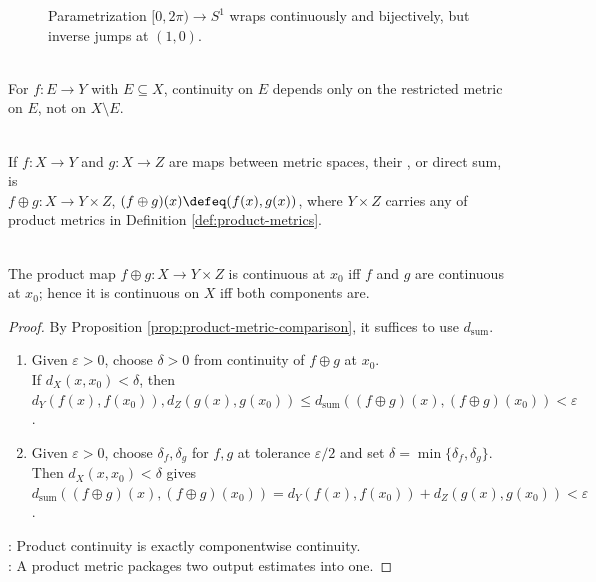 \begin{figure}[htbp]
  \centering
  
  \caption{Parametrization $[0,2\pi)\to S^1$ wraps continuously and bijectively, but inverse jumps at $(1,0)$.}
  \label{fig:circle-interval-wrap-not-homeomorphism}
\end{figure}

\begin{remark} \label{rem:continuity-domain-only} \\
For $f:E\to Y$ with $E\subseteq X$, continuity on $E$ depends only on the restricted metric on $E$, not on $X\setminus E$.
\end{remark}

\begin{definition} \label{def:product-map-direct-sum} \\
If $f:X\to Y$ and $g:X\to Z$ are maps between metric spaces, their , or direct sum, is\\
$f\oplus g:X\to Y\times Z$, $(f\oplus g)(x)\defeq(f(x),g(x))$, where $Y\times Z$ carries any of product metrics in Definition \ref{def:product-metrics}.
\end{definition}

\begin{proposition} \label{prop:product-map-continuity} \\
The product map $f\oplus g:X\to Y\times Z$ is continuous at $x_0$ iff $f$ and $g$ are continuous at $x_0$; hence it is continuous on $X$ iff both components are.
\begin{proof}
By Proposition \ref{prop:product-metric-comparison}, it suffices to use $d_{\mathrm{sum}}$.
\begin{enumerate}[label=\roman*.]
\setlength{\itemsep}{0pt}
\item[$(\Rightarrow)$] Given $\varepsilon>0$, choose $\delta>0$ from continuity of $f\oplus g$ at $x_0$.\\
If $d_X(x,x_0)<\delta$, then $d_Y(f(x),f(x_0)),d_Z(g(x),g(x_0))\leq d_{\mathrm{sum}}((f\oplus g)(x),(f\oplus g)(x_0))<\varepsilon$.
\item[$(\Leftarrow)$] Given $\varepsilon>0$, choose $\delta_f,\delta_g$ for $f,g$ at tolerance $\varepsilon/2$ and set $\delta=\min\{\delta_f,\delta_g\}$.\\
Then $d_X(x,x_0)<\delta$ gives $d_{\mathrm{sum}}((f\oplus g)(x),(f\oplus g)(x_0))=d_Y(f(x),f(x_0))+d_Z(g(x),g(x_0))<\varepsilon$.
\end{enumerate}
: Product continuity is exactly componentwise continuity.\\
: A product metric packages two output estimates into one.
\end{proof}
\end{proposition}

